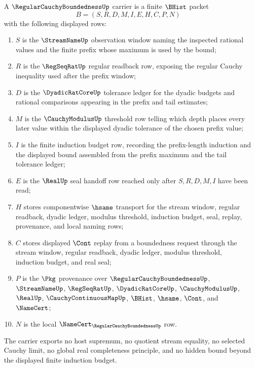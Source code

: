\begin{definition}
\label{def:regular-cauchy-boundedness-carrier}
A $\RegularCauchyBoundednessUp$ carrier is a finite $\BHist$ packet
$$
B=(S,R,D,M,I,E,H,C,P,N)
$$
with the following displayed rows:
\begin{enumerate}
\item $S$ is the $\StreamNameUp$ observation window naming the inspected rational values and the finite prefix whose maximum is used by the bound;
\item $R$ is the $\RegSeqRatUp$ regular readback row, exposing the regular Cauchy inequality used after the prefix window;
\item $D$ is the $\DyadicRatCoreUp$ tolerance ledger for the dyadic budgets and rational comparisons appearing in the prefix and tail estimates;
\item $M$ is the $\CauchyModulusUp$ threshold row telling which depth places every later value within the displayed dyadic tolerance of the chosen prefix value;
\item $I$ is the finite induction budget row, recording the prefix-length induction and the displayed bound assembled from the prefix maximum and the tail tolerance ledger;
\item $E$ is the $\RealUp$ seal handoff row reached only after $S,R,D,M,I$ have been read;
\item $H$ stores componentwise $\hsame$ transport for the stream window, regular readback, dyadic ledger, modulus threshold, induction budget, seal, replay, provenance, and local naming rows;
\item $C$ stores displayed $\Cont$ replay from a boundedness request through the stream window, regular readback, dyadic ledger, modulus threshold, induction budget, and real seal;
\item $P$ is the $\Pkg$ provenance over $\RegularCauchyBoundednessUp$, $\StreamNameUp$, $\RegSeqRatUp$, $\DyadicRatCoreUp$, $\CauchyModulusUp$, $\RealUp$, $\CauchyContinuousMapUp$, $\BHist$, $\hsame$, $\Cont$, and $\NameCert$;
\item $N$ is the local $\NameCert_{\RegularCauchyBoundednessUp}$ row.
\end{enumerate}
The carrier exports no host supremum, no quotient stream equality, no selected Cauchy limit, no global real completeness principle, and no hidden bound beyond the displayed finite induction budget.
\end{definition}


